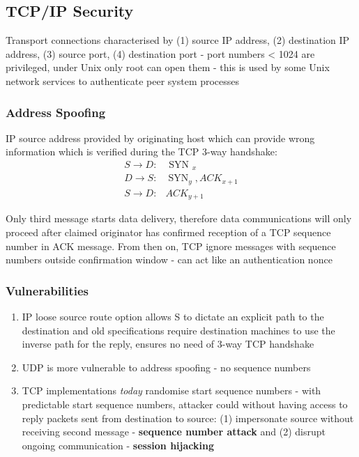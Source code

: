 \documentclass{article}
\newenvironment{cons}{\par\color{red}}{\par}
\begin{document}
\subsection{TCP/IP Security}
Transport connections characterised by (1) source IP address, (2) destination IP address, (3) source port, (4) destination port - port numbers < 1024 are privileged, under Unix only root can open them - this is used by some Unix network services to authenticate peer system processes

\begin{cons}
\subsubsection{Address Spoofing}
IP source address provided by originating host which can provide wrong information which is verified during the TCP 3-way handshake:
$$\begin{array}{ll}{S \rightarrow D :} & {\text { SYN }_{x}} \\ {D \rightarrow S :} & {\operatorname{SYN}_{y}, A C K_{x+1}} \\ {S \rightarrow D :} & {A C K_{y+1}}\end{array}$$

Only third message starts data delivery, therefore data communications will only proceed after claimed originator has confirmed reception of a TCP sequence number in ACK message. From then on, TCP ignore messages with sequence numbers outside confirmation window - can act like an authentication nonce


\subsubsection{Vulnerabilities}
\begin{enumerate}
	\item IP loose source route option allows S to dictate an explicit path to the destination and old specifications require destination machines to use the inverse path for the reply, ensures no need of 3-way TCP handshake
	
	\item UDP is more vulnerable to address spoofing - no sequence numbers
	
	\item TCP implementations \textit{today} randomise start sequence numbers - with predictable start sequence numbers, attacker could without having access to reply packets sent from destination to source: (1) impersonate source without receiving second message - \textbf{sequence number attack} and (2) disrupt ongoing communication - \textbf{session hijacking}
	

\end{enumerate}
\end{cons}
\end{document}
